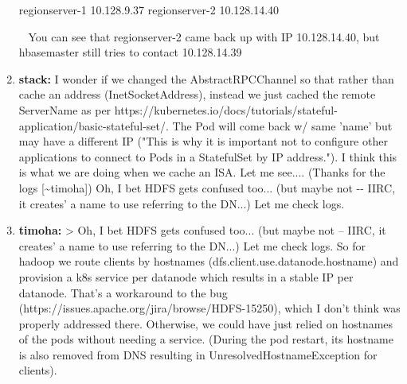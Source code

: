 \documentclass{report}%
\begin{document}
\begin{enumerate}
\begin{spverbatim}
regionserver-1 10.128.9.37
regionserver-2 10.128.14.40\end{spverbatim}\ \newline%
\newline%
You can see that regionserver{-}2 came back up with IP 10.128.14.40, but hbasemaster still tries to contact 10.128.14.39\newline%
\newline%
\newline%
\newline%
%
\item%
\textbf{stack: }I wonder if we changed the AbstractRPCChannel so that rather than cache an address (InetSocketAddress), instead we just cached the remote ServerName as per https://kubernetes.io/docs/tutorials/stateful{-}application/basic{-}stateful{-}set/. The Pod will come back w/ same 'name' but may have a different IP ("This is why it is important not to configure other applications to connect to Pods in a StatefulSet by IP address."). I think this is what we are doing when we cache an ISA. Let me see.... (Thanks for the logs {[}\textasciitilde{}timoha{]})\newline%
\newline%
\newline%
\newline%
Oh, I bet HDFS gets confused too... (but maybe not {-}{-} IIRC, it creates' a name to use referring to the DN...) Let me check logs.%
\item%
\textbf{timoha: }> Oh, I bet HDFS gets confused too... (but maybe not – IIRC, it creates' a name to use referring to the DN...) Let me check logs.\newline%
\newline%
\newline%
\newline%
So for hadoop we route clients by hostnames (dfs.client.use.datanode.hostname) and provision a k8s service per datanode which results in a stable IP per datanode. That's a workaround to the bug (https://issues.apache.org/jira/browse/HDFS{-}15250), which I don't think was properly addressed there. Otherwise, we could have just relied on hostnames of the pods without needing a service.\newline%
(During the pod restart, its hostname is also removed from DNS resulting in UnresolvedHostnameException for clients).\newline%
\newline%
\newline%
\newline%

\end{enumerate}
\end{document}
